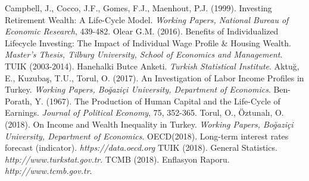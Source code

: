 \documentclass[]{elsarticle}
\begin{document}
\begin{thebibliography}{}
 Campbell, J., Cocco, J.F., Gomes, F.J., Maenhout, P.J. (1999). Investing Retirement Wealth: A Life-Cycle Model. \textit{Working Papers, National Bureau of Economic Research}, 439-482.
 Olear G.M. (2016). Benefits of Individualized Lifecycle Investing: The Impact of Individual Wage Profile \& Housing Wealth. \textit{Master's Thesis, Tilburg University, School of Economics and Management}.
 TUIK (2003-2014). Hanehalki Butce Anketi. \textit{Turkish Statistical Institute}.
 Aktuğ, E., Kuzubaş, T.U., Torul, O. (2017). An Investigation of Labor Income Profiles in Turkey. \textit{Working Papers, Boğaziçi  University, Department of Economics}.
 Ben-Porath, Y. (1967). The  Production  of  Human  Capital  and  the  Life-Cycle  of  Earnings. \textit{Journal of Political Economy}, 75, 352-365.
 Torul, O., Öztunalı, O. (2018). On Income and Wealth Inequality in Turkey. \textit{Working Papers, Boğaziçi University, Department of Economics}.
 OECD(2018). Long-term interest rates forecast (indicator). \textit{https://data.oecd.org}
 TUIK (2018). General Statistics. \textit{http://www.turkstat.gov.tr}.
 TCMB (2018). Enflasyon Raporu. \textit{http://www.tcmb.gov.tr}.
\end{thebibliography}
\end{document}
